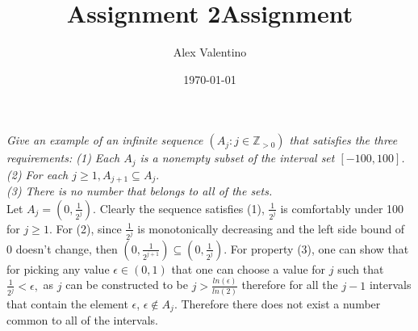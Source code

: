 \documentclass[12pt, letterpaper]{article}
\date{\today}
\title{Assignment 2}
\author{Alex Valentino}
\title{Assignment }
\newcommand{\Z}{\mathbb{Z}}
\begin{document}
	\textit{Give an example of an infinite sequence $(A_j : j \in \Z_{>0})$ that satisfies the three requirements:
(1) Each $A_j$ is a nonempty subset of the interval set $[-100, 100]$. \\
(2) For each $j \geq 1,A_{j + 1} \subseteq A_j.$\\
(3) There is no number that belongs to all of the sets.\\}
Let $A_j = (0,\displaystyle \frac{1}{2^j}).$  Clearly the sequence satisfies (1), $\displaystyle \frac{1}{2^j}$ is comfortably under 100 for $j \geq 1$.  For (2), since $\displaystyle \frac{1}{2^j}$ is monotonically decreasing and the left side bound of 0 doesn't change, then $\displaystyle (0,\frac{1}{2^{j+1}}) \subseteq (0,\frac{1}{2^j } )$.  For property (3), one can show that for picking any value $\epsilon \in (0,1)$ that one can choose a value for $j$ such that $\displaystyle \frac{1}{2^j} < \epsilon,$ as $j$ can be constructed to be $j > \frac{ln(\epsilon)}{ln(2)}$ therefore for all the $j-1$ intervals that contain the element $\epsilon$, $\epsilon \notin A_j$.  Therefore there does not exist a number common to all of the intervals.  
\end{document}

